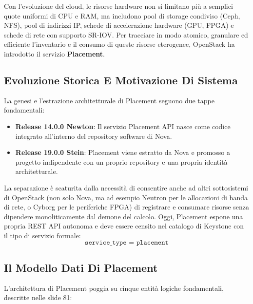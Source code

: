 \documentclass[11pt, a4paper]{article}
\begin{document}
Con l'evoluzione del cloud, le risorse hardware non si limitano più a semplici quote uniformi di CPU e RAM, ma includono pool di storage condiviso (Ceph, NFS), pool di indirizzi IP, schede di accelerazione hardware (GPU, FPGA) e schede di rete con supporto SR-IOV. Per tracciare in modo atomico, granulare ed efficiente l'inventario e il consumo di queste risorse eterogenee, OpenStack ha introdotto il servizio \textbf{Placement}.

\subsection{Evoluzione Storica E Motivazione Di Sistema}

La genesi e l'estrazione architetturale di Placement seguono due tappe fondamentali:
\begin{itemize}[noitemsep]
    \item \textbf{Release 14.0.0 Newton}: Il servizio Placement API nasce come codice integrato all'interno del repository software di Nova.
    \item \textbf{Release 19.0.0 Stein}: Placement viene estratto da Nova e promosso a progetto indipendente con un proprio repository e una propria identità architetturale.
\end{itemize}

La separazione è scaturita dalla necessità di consentire anche ad altri sottosistemi di OpenStack (non solo Nova, ma ad esempio Neutron per le allocazioni di banda di rete, o Cyborg per le periferiche FPGA) di registrare e consumare risorse senza dipendere monoliticamente dal demone del calcolo. Oggi, Placement espone una propria REST API autonoma e deve essere censito nel catalogo di Keystone con il tipo di servizio formale:
\[
\texttt{service\_type = placement}
\]

\subsection{Il Modello Dati Di Placement}

L'architettura di Placement poggia su cinque entità logiche fondamentali, descritte nelle slide 81:
\end{document}

